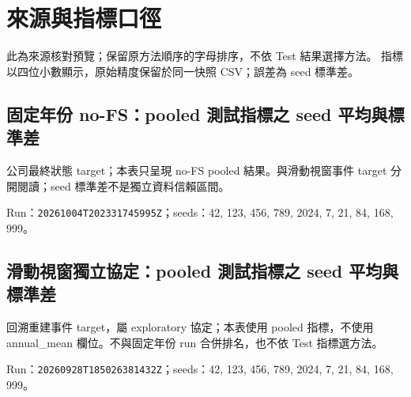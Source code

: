 \section*{來源與指標口徑}
此為來源核對預覽；保留原方法順序的字母排序，不依 Test 結果選擇方法。
指標以四位小數顯示，原始精度保留於同一快照 CSV；誤差為 seed 標準差。

\subsection*{固定年份 no-FS：pooled 測試指標之 seed 平均與標準差}
公司最終狀態 target；本表只呈現 no-FS pooled 結果。與滑動視窗事件 target 分開閱讀；seed 標準差不是獨立資料信賴區間。
\par Run：\texttt{20261004T202331745995Z}；seeds：42, 123, 456, 789, 2024, 7, 21, 84, 168, 999。\par

\subsection*{滑動視窗獨立協定：pooled 測試指標之 seed 平均與標準差}
回溯重建事件 target，屬 exploratory 協定；本表使用 pooled 指標，不使用 annual\_\allowbreak{}mean 欄位。不與固定年份 run 合併排名，也不依 Test 指標選方法。
\par Run：\texttt{20260928T185026381432Z}；seeds：42, 123, 456, 789, 2024, 7, 21, 84, 168, 999。\par
